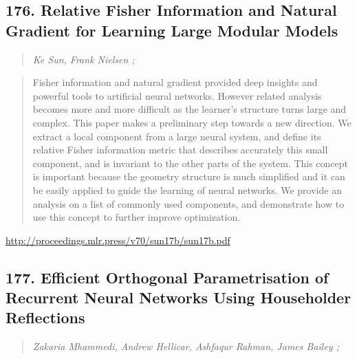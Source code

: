 \documentclass{article}
\begin{document}
\subsection{176. Relative Fisher Information and Natural Gradient for Learning Large Modular Models}

\begin{quote}
\footnotesize{\textit{Ke Sun, Frank Nielsen ;}}

\end{quote}

\begin{quote}
    Fisher information and natural gradient provided deep insights and powerful tools to artificial neural networks. However related analysis becomes more and more difficult as the learner’s structure turns large and complex. This paper makes a preliminary step towards a new direction. We extract a local component from a large neural system, and define its relative Fisher information metric that describes accurately this small component, and is invariant to the other parts of the system. This concept is important because the geometry structure is much simplified and it can be easily applied to guide the learning of neural networks. We provide an analysis on a list of commonly used components, and demonstrate how to use this concept to further improve optimization.  
\end{quote}

\href{http://proceedings.mlr.press/v70/sun17b/sun17b.pdf}{http://proceedings.mlr.press/v70/sun17b/sun17b.pdf}

\subsection{177. Efficient Orthogonal Parametrisation of Recurrent Neural Networks Using Householder Reflections}

\begin{quote}
\footnotesize{\textit{Zakaria Mhammedi, Andrew Hellicar, Ashfaqur Rahman, James Bailey ;}}

\end{quote}
\end{document}
